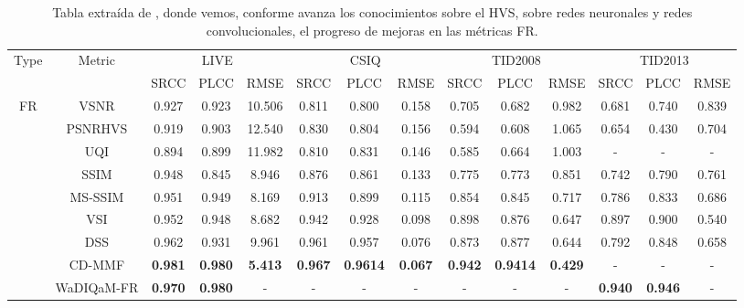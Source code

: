 \begin{table}[htp]
  \tiny
  \hspace{-1.8cm}
  \begin{tabular}{|c|c|c|c|c|c|c|c|c|c|c|c|c|c|}
    \hline
    \multirow{2}{*}{Type} & \multirow{2}{*}{Metric} & \multicolumn{3}{c|}{LIVE}& \multicolumn{3}{c|}{CSIQ} & \multicolumn{3}{c|}{TID2008} & \multicolumn{3}{c|}{TID2013} \\
    \cline{3-14}
                          & & SRCC & PLCC & RMSE & SRCC & PLCC & RMSE & SRCC & PLCC & RMSE & SRCC & PLCC & RMSE \\
    \hline
    \multirow{10}{*}{FR}
                   & VSNR\cite{VSNR} & 0.927 & 0.923 & 10.506 & 0.811 & 0.800 & 0.158 & 0.705 & 0.682 & 0.982 & 0.681 & 0.740 & 0.839 \\
                   & PSNRHVS\cite{PSNR-HVS} & 0.919 & 0.903 & 12.540 & 0.830 & 0.804 & 0.156 & 0.594 & 0.608 & 1.065 & 0.654 & 0.430 & 0.704 \\
                   & UQI\cite{UQI} & 0.894 & 0.899 & 11.982 & 0.810 & 0.831 & 0.146 & 0.585 & 0.664 & 1.003 & - & - & -\\
                   & SSIM\cite{SSIM} & 0.948 & 0.845 & 8.946 & 0.876 & 0.861 & 0.133 & 0.775 & 0.773 & 0.851 & 0.742 & 0.790 & 0.761\\ 
                   & MS-SSIM\cite{MS-SSIM} & 0.951 & 0.949 & 8.169 & 0.913 & 0.899 & 0.115 & 0.854 & 0.845 & 0.717 & 0.786 & 0.833 & 0.686\\
                   & VSI\cite{VSI} & 0.952 & 0.948 & 8.682 & 0.942 & 0.928 & 0.098 & 0.898 & 0.876 & 0.647 & 0.897 & 0.900 & 0.540\\
                   & DSS\cite{DSS} & 0.962 & 0.931 & 9.961 & 0.961 & 0.957 & 0.076 & 0.873 & 0.877 & 0.644 & 0.792 & 0.848 & 0.658\\
                   & CD-MMF\cite{MMF} & \textbf{0.981} & \textbf{0.980} & \textbf{5.413} & \textbf{0.967} & \textbf{0.9614} & \textbf{0.067} & \textbf{0.942} & \textbf{0.9414} & \textbf{0.429} & - & - & -\\
                   & WaDIQaM-FR\cite{DIQaM} & \textbf{0.970} & \textbf{0.980} & - & - & - & - & - & - & - & \textbf{0.940} & \textbf{0.946} & -\\
                  \hline 
  \end{tabular}
  \caption[Tablas estado del arte FR-IQA]{Tabla extraída de \cite{SurveyOf2D3DMetrics}, donde vemos, conforme avanza los conocimientos
  sobre el HVS, sobre redes neuronales y redes convolucionales, el progreso de mejoras en las métricas FR.}
    \label{tab:SOTAFRIQA}
\end{table}

